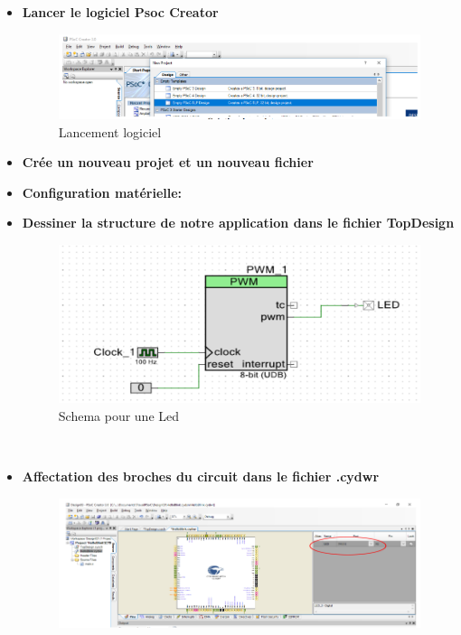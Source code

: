 \begin{itemize}
    \item \textbf{Lancer le logiciel Psoc Creator}
      \begin{figure}[htp]
        \centering
        \includegraphics[width=1.1\textwidth]{images/lancement.png }
        \caption{Lancement logiciel }
        \label{fig:example1}
      \end{figure}

    \item \textbf{Crée un nouveau projet et un nouveau fichier} 
    \item \textbf{Configuration matérielle:}
    \item \textbf{Dessiner la structure de notre application dans le fichier TopDesign}
    \begin{figure}[htp]
        \centering
        \includegraphics[width=1.1\textwidth]{images/schema1.png }
        \caption{Schema pour une Led }
        \label{fig:example2}
      \end{figure}
    \\
    \item \textbf{Affectation des broches du circuit dans le fichier .cydwr}
    \\
    \begin{figure}[htp]
        \centering
        \includegraphics[width=1.1\textwidth]{images/broche.png }

\end{figure}
\end{itemize}
